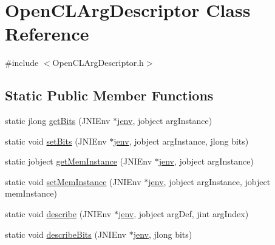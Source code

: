\hypertarget{class_open_c_l_arg_descriptor}{\section{Open\-C\-L\-Arg\-Descriptor Class Reference}
\label{class_open_c_l_arg_descriptor}
}


{\ttfamily \#include $<$Open\-C\-L\-Arg\-Descriptor.\-h$>$}

\subsection*{Static Public Member Functions}
\begin{DoxyCompactItemize}
\item 
static jlong \hyperlink{class_open_c_l_arg_descriptor_acb37f994e2c7f2e52a48f5cc81a5d198}{get\-Bits} (J\-N\-I\-Env $\ast$\hyperlink{aparapi_8cpp_a31595c73e9a3750524b2ff61b5a14f96}{jenv}, jobject arg\-Instance)
\item 
static void \hyperlink{class_open_c_l_arg_descriptor_a51143b3ee7dd05fa00b58b2a48b88ae6}{set\-Bits} (J\-N\-I\-Env $\ast$\hyperlink{aparapi_8cpp_a31595c73e9a3750524b2ff61b5a14f96}{jenv}, jobject arg\-Instance, jlong bits)
\item 
static jobject \hyperlink{class_open_c_l_arg_descriptor_a479dbd0dfae1b2982bc9024c0e104b1d}{get\-Mem\-Instance} (J\-N\-I\-Env $\ast$\hyperlink{aparapi_8cpp_a31595c73e9a3750524b2ff61b5a14f96}{jenv}, jobject arg\-Instance)
\item 
static void \hyperlink{class_open_c_l_arg_descriptor_a783eb6d6595b649e97fbd30d9d0eb334}{set\-Mem\-Instance} (J\-N\-I\-Env $\ast$\hyperlink{aparapi_8cpp_a31595c73e9a3750524b2ff61b5a14f96}{jenv}, jobject arg\-Instance, jobject mem\-Instance)
\item 
static void \hyperlink{class_open_c_l_arg_descriptor_a88823c16d3b1be1f917fe7e527be08c6}{describe} (J\-N\-I\-Env $\ast$\hyperlink{aparapi_8cpp_a31595c73e9a3750524b2ff61b5a14f96}{jenv}, jobject arg\-Def, jint arg\-Index)
\item 
static void \hyperlink{class_open_c_l_arg_descriptor_ad5a2973c35ac3e74fd0e1675b1134588}{describe\-Bits} (J\-N\-I\-Env $\ast$\hyperlink{aparapi_8cpp_a31595c73e9a3750524b2ff61b5a14f96}{jenv}, jlong bits)
\end{DoxyCompactItemize}



